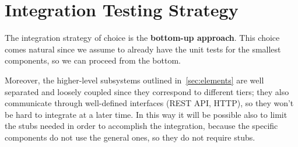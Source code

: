 \section{Integration Testing Strategy}
\label{sec:integration-testing-strategy}

The integration strategy of choice is the \textbf{bottom-up approach}.
This choice comes natural since we assume to already have the unit tests for the smallest components, so we can proceed from the bottom.

Moreover, the higher-level subsystems outlined in~\autoref{sec:elements} are well separated and loosely coupled since they correspond to different tiers;
they also communicate through well-defined interfaces (REST API, HTTP), so they won't be hard to integrate at a later time.
In this way it will be possible also to limit the stubs needed in order to accomplish the integration, because the specific components do not use the general ones, so they do not require stubs.
